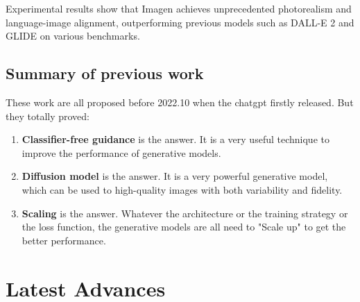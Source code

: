 \documentclass{article}
\begin{document}
Experimental results show that Imagen achieves unprecedented photorealism and language-image alignment, 
outperforming previous models such as DALL-E 2 and GLIDE on various benchmarks. 


\subsection{Summary of previous work}
These work are all proposed before 2022.10 when the chatgpt firstly released. But they totally proved:
\begin{enumerate}
    \item \textbf{Classifier-free guidance} is the answer. It is a very useful technique to improve the performance of generative models.
    \item \textbf{Diffusion model} is the answer. It is a very powerful generative model, which can be used to high-quality images 
    with both variability and fidelity.
    \item \textbf{Scaling} is the answer. Whatever the architecture or the training strategy or the loss function, the generative models are all 
    need to "Scale up" to get the better performance.
\end{enumerate}


\section{Latest Advances}
\end{document}
